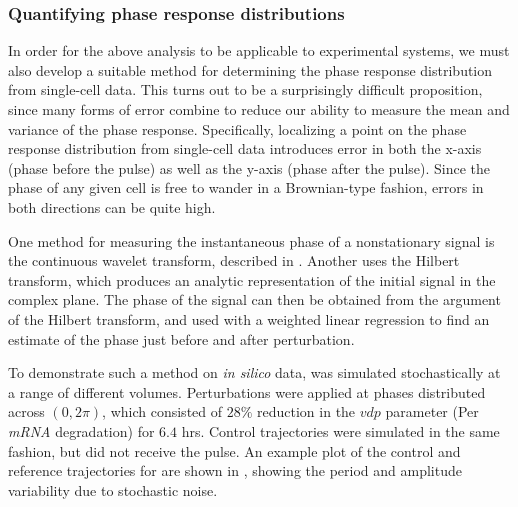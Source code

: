 \subsubsection{Quantifying phase response distributions}

In order for the above analysis to be applicable to experimental systems, we must also develop a suitable method for determining the phase response distribution from single-cell data.
This turns out to be a surprisingly difficult proposition, since many forms of error combine to reduce our ability to measure the mean and variance of the phase response.
Specifically, localizing a point on the phase response distribution from single-cell data introduces error in both the x-axis (phase before the pulse) as well as the y-axis (phase after the pulse).
Since the phase of any given cell is free to wander in a Brownian-type fashion, errors in both directions can be quite high.

One method for measuring the instantaneous phase of a nonstationary signal is the continuous wavelet transform, described in .
Another uses the Hilbert transform, which produces an analytic representation of the initial signal in the complex plane.
The phase of the signal can then be obtained from the argument of the Hilbert transform, and used with a weighted linear regression to find an estimate of the phase just before and after perturbation.

To demonstrate such a method on {\itshape in silico} data,  was simulated stochastically at a range of different volumes.
Perturbations were applied at phases distributed across $(0, 2\pi)$, which consisted of $28\%$ reduction in the $vdp$ parameter (Per {\itshape mRNA} degradation) for $6.4$ hrs.
Control trajectories were simulated in the same fashion, but did not receive the pulse.
An example plot of the control and reference trajectories for are shown in , showing the period and amplitude variability due to stochastic noise.

